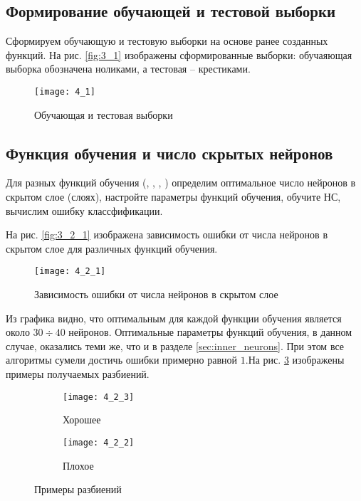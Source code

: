 \subsection{Формирование обучающей и тестовой выборки}

Сформируем обучающую и тестовую выборки на основе ранее созданных функций. На рис. \ref{fig:3_1} изображены сформированные выборки: обучаяющая выборка обозначена ноликами, а тестовая -- крестиками.
\begin{figure}[H]
\begin{center}
	\texttt{[image: 4\_1]}
	\caption{Обучающая и тестовая выборки}
	\label{fig:4_1}
\end{center}
\end{figure}

\subsection{Функция обучения и число скрытых нейронов}

Для разных функций обучения (, , , ) определим оптимальное число нейронов в скрытом слое (слоях), настройте параметры функций обучения, обучите НС, вычислим ошибку классфификации.

На рис. \ref{fig:3_2_1} изображена зависимость ошибки от числа нейронов в скрытом слое для различных функций обучения.
\begin{figure}[H]
\begin{center}
	\texttt{[image: 4\_2\_1]}
	\caption{Зависимость ошибки от числа нейронов в скрытом слое}
	\label{fig:4_2_1}
\end{center}
\end{figure}
Из графика видно, что оптимальным для каждой функции обучения является около $30 \div 40$ нейронов. Оптимальные параметры функций обучения, в данном случае, оказались теми же, что и в разделе \ref{sec:inner_neurons}. При этом  все алгоритмы сумели достичь ошибки  примерно равной $1$.На рис. \ref{fig:4_2} изображены примеры получаемых разбиений.
\begin{figure}[H]
\begin{center}
	\begin{subfigure}[b]{0.49\textwidth}
		\texttt{[image: 4\_2\_3]}
		\caption{Хорошее}
	\end{subfigure}
	\begin{subfigure}[b]{0.49\textwidth}
		\texttt{[image: 4\_2\_2]}
		\caption{Плохое}
	\end{subfigure}
	\caption{Примеры разбиений}
	\label{fig:4_2}
\end{center}
\end{figure}

